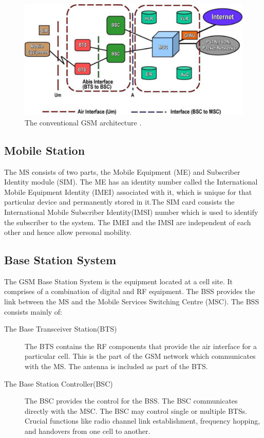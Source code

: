 \begin{figure}[h]
\centering
\includegraphics[width=1\textwidth]{../images/gsmArch}
\caption[The conventional GSM architecture]{The conventional GSM architecture {\cite{wikiHill2dot0}}.}
\label{gsmArch}
\end{figure}

\subsection{Mobile Station}
The MS consists of two parts, the Mobile Equipment (ME) and Subscriber
Identity module (SIM). The ME has an identity number called the International
 Mobile Equipment Identity (IMEI) associated with it, which is unique for
that particular device and permanently stored in it.The SIM card consists
the International Mobile Subscriber Identity(IMSI) number which is used
to identify the subscriber to the system. The IMEI and the IMSI are independent
of each other and hence allow personal mobility.

\subsection{Base Station System}
The GSM Base Station System is the equipment located at a cell site. It
comprises of a combination of digital and RF equipment. The BSS provides
the link between the MS and the Mobile Services Switching Centre (MSC).
The BSS consists mainly of:
\begin{description}
\item[The Base Transceiver Station(BTS)]
The BTS contains the RF components that provide the air interface for
 a particular cell. This is the part of the GSM network which communicates
 with the MS. The antenna is included as part of the BTS.
\item[The Base Station Controller(BSC)]
The BSC provides the control for the BSS. The BSC communicates directly
with the MSC. The BSC may control single or multiple BTSs. Crucial functions
like radio channel link establishment, frequency hopping, and handovers from
one cell to another.

\end{description}

